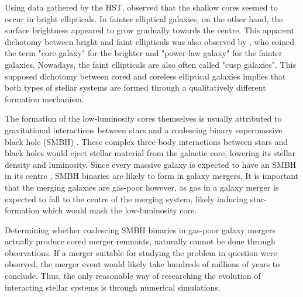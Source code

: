 \documentclass[english, twoside]{HYgradu}
\begin{document}
Using data gathered by the HST, \cite{Ferrarese1994} observed that the shallow cores seemed to occur in bright ellipticals. In fainter elliptical galaxies, on the other hand, the surface brightness appeared to grow gradually towards the centre. This apparent dichotomy between bright and faint ellipticals was also observed by \cite{Lauer1995}, who coined the term "core galaxy" for the brighter and "power-law galaxy" for the fainter galaxies. Nowadays, the faint ellipticals are also often called "cusp galaxies". This supposed dichotomy between cored and coreless elliptical galaxies implies that both types of stellar systems are formed through a qualitatively different formation mechanism. 


The formation of the low-luminosity cores themselves is usually attributed to gravitational interactions between stars and a coalescing binary supermassive black hole (SMBH) \citep{Begelman1980, Faber1997, GalaxyFormationAndEvo2010}. These complex three-body interactions between stars and black holes would eject stellar material from the galactic core, lowering its stellar density and luminosity. Since every massive galaxy is expected to have an SMBH in its centre \citep{Kormendy2013}, SMBH binaries are likely to form in galaxy mergers. It is important that the merging galaxies are gas-poor however, as gas in a galaxy merger is expected to fall to the centre of the merging system, likely inducing star-formation which would mask the low-luminosity core.

Determining whether coalescing SMBH binaries in gas-poor galaxy mergers actually produce cored merger remnants, naturally cannot be done through observations. If a merger suitable for studying the problem in question were observed, the merger event would likely take hundreds of millions of years to conclude. Thus, the only reasonable way of researching the evolution of interacting stellar systems is through numerical simulations.


\end{document}
